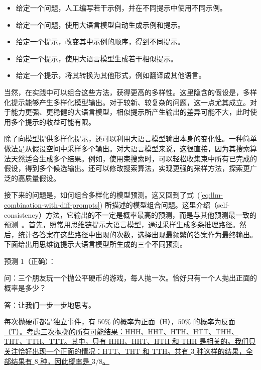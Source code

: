 \begin{itemize}
\item \vspace{0.5em} 给定一个问题，人工编写若干示例，并在不同提示中使用不同示例。
\item \vspace{0.2em} 给定一个问题，使用大语言模型自动生成示例和提示。
\item \vspace{0.2em} 给定一个提示，改变其中示例的顺序，得到不同提示。
\item \vspace{0.2em} 给定一个提示，使用大语言模型生成若干相似提示。
\item \vspace{0.2em} 给定一个提示，将其转换为其他形式，例如翻译成其他语言。
\end{itemize}
\vspace{0.5em}

当然，在实践中可以组合这些方法，获得更高的多样性。这里隐含的假设是，多样化提示能够产生多样化模型输出。对于较新、较复杂的问题，这一点尤其成立。对于能力更强、更稳健的大语言模型，相似提示所产生输出的差异可能不大，此时使用多个提示的收益可能有限。

除了向模型提供多样化提示，还可以利用大语言模型输出本身的变化性。一种简单做法是从假设空间中采样多个输出。对大语言模型来说，这很直接，因为其搜索算法天然适合生成多个结果。例如，使用束搜索时，可以轻松收集束中所有已完成的假设，得到多个候选输出。还可以修改搜索算法，实现更强的采样方法，探索更广泛的高质量假设。

接下来的问题是，如何组合多样化的模型预测。这又回到了式~(\ref{eq:llm-combination-with-diff-prompts}) 所描述的模型组合问题。这里介绍（self-consistency）方法，它输出的不一定是概率最高的预测，而是与其他预测最一致的预测~\cite{wang-etal:2022rationale,wang-etal:2023self}。首先，照常用思维链提示大语言模型，通过采样生成多条推理路径。然后，统计各答案在这些路径中出现的次数，选择出现最频繁的答案作为最终输出。下面给出用思维链提示大语言模型所生成的三个不同预测。

\vspace{0.5em}
预测 1（正确）：
\begin{tcolorbox}

\begingroup
\setlength{\leftskip}{2em}
\setlength{\rightskip}{2em}

问：三个朋友玩一个抛公平硬币的游戏，每人抛一次。恰好只有一个人抛出正面的概率是多少？

\vspace{0.5em}

答：让我们一步一步地思考。

\vspace{0.2em}

\uline{每次抛硬币都是独立事件，有 $50\%$ 的概率为正面（H），$50\%$ 的概率为反面（T）。考虑三次抛掷的所有可能结果：HHH、HHT、HTH、HTT、THH、THT、TTH、TTT。其中，只有 HHH、HHT、HTH 和 THH 是相关的。我们只关注恰好出现一个正面的情况：HTT、THT 和 TTH。共有 $3$ 种这样的结果，全部结果有 $8$ 种，因此概率是 $3/8$。}

\endgroup

\end{tcolorbox}
\vspace{0.5em}

